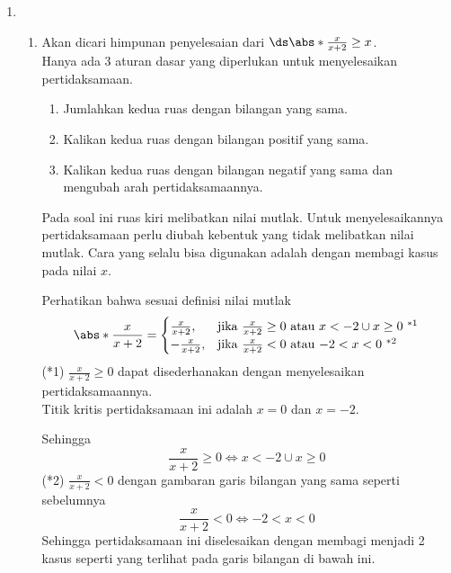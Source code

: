 \begin{enumerate}[leftmargin=*, label={\arabic*}.]
\item
\begin{enumerate}[label={\alph*}.]
    \item Akan dicari himpunan penyelesaian dari 
    $\ds \abs*{\frac{x}{x+2}} \geq x$.\\
    Hanya ada 3 aturan dasar yang diperlukan untuk menyelesaikan pertidaksamaan.
    \begin{enumerate}[label={\arabic*})]
        \item Jumlahkan kedua ruas dengan bilangan yang sama.
        \item Kalikan kedua ruas dengan bilangan positif yang sama.
        \item Kalikan kedua ruas dengan bilangan negatif yang sama dan 
        mengubah arah pertidaksamaannya.
    \end{enumerate}
    Pada soal ini ruas kiri melibatkan nilai mutlak. Untuk menyelesaikannya 
    pertidaksamaan perlu diubah kebentuk yang tidak melibatkan nilai mutlak. 
    Cara yang selalu bisa digunakan adalah dengan membagi kasus pada nilai $x$.
        
    Perhatikan bahwa sesuai definisi nilai mutlak
    \[
    \abs*{\frac{x}{x+2}} = 
    \begin{cases}
        \frac{x}{x+2}, &\text{jika $\frac{x}{x+2} \geq 0$ atau $x < -2 \cup x \geq 0$ $^{*1}$}\\
        -\frac{x}{x+2}, &\text{jika $\frac{x}{x+2} < 0$ atau $-2 < x < 0$ $^{*2}$}
    \end{cases}
    \]
    (*1) $\frac{x}{x+2} \geq 0$ dapat disederhanakan dengan menyelesaikan 
    pertidaksamaannya. \\Titik kritis pertidaksamaan ini adalah $x= 0$ dan $x=-2$.
    \begin{center}
    \end{center}
    Sehingga
    \[
        \frac{x}{x+2} \geq 0 \iff x < -2 \cup x \geq 0
    \]
    (*2) $\frac{x}{x+2} < 0$ dengan gambaran garis bilangan yang sama seperti sebelumnya
    \[
        \frac{x}{x+2} < 0 \iff -2 < x < 0
    \]
    Sehingga pertidaksamaan ini diselesaikan dengan membagi menjadi 2 kasus seperti 
yang terlihat pada garis bilangan di bawah ini.


\end{enumerate}
\end{enumerate}
